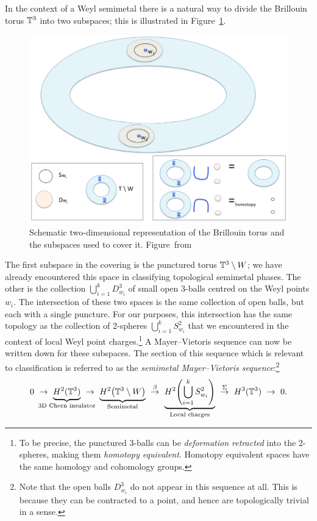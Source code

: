 In the context of a Weyl semimetal there is a natural way to divide the Brillouin torus $\mathbb{T}^3$ into two subspaces; this is illustrated in Figure~\ref{fig:semimetal-MV}.
\begin{figure}[htb!]
	\centering
	\includegraphics[width=.8\linewidth]{Images/semimetal-MV}
	\caption{
		Schematic two-dimensional representation of the Brillouin torus and the subspaces used to cover it.
		Figure~from \cite{Thiang_equivariant}}
	\label{fig:semimetal-MV}
\end{figure}
The first subspace in the covering is the punctured torus $\mathbb{T}^3\setminus W$; we have already encountered this space in classifying topological semimetal phases. The other is the collection $\bigcup_{i=1}^k D_{w_i}^3$ of small open 3-balls centred on the Weyl points $w_i$. The intersection of these two spaces is the same collection of open balls, but each with a single puncture. For our purposes, this intersection has the same topology as the collection of 2-spheres $\bigcup_{i=1}^k S_{w_i}^2$ that we encountered in the context of local Weyl point charges.\footnote{
	To be precise, the punctured 3-balls can be \emph{deformation retracted} into the 2-spheres, making them \emph{homotopy equivalent}. Homotopy equivalent spaces have the same homology and cohomology groups.}
A Mayer--Vietoris sequence can now be written down for these subspaces. The section of this sequence which is relevant to classification is referred to as the \emph{semimetal Mayer--Vietoris sequence}:\footnote{
	Note that the open balls $D_{w_i}^3$ do not appear in this sequence at all. This is because they can be contracted to a point, and hence are topologically trivial in a sense.}
\begin{equation}\label{eq:semimetal-MV-symbolic}
	0\ \to\ \underbrace{H^2(\T^3)}_{\mathclap{\text{3D Chern insulator}}}\ \to\ 
	\underbrace{H^2\big(\T^3\setminus W\big)}_{\text{Semimetal}}\ \overset{\beta}{\to}\ \underbrace{H^2\!\left(\bigcup_{i=1}^k S_{w_i}^2\right)}_{\text{Local charges}}\ \overset{\Sigma}{\to}\ H^3(\T^3)\ \to\ 0.
\end{equation}
